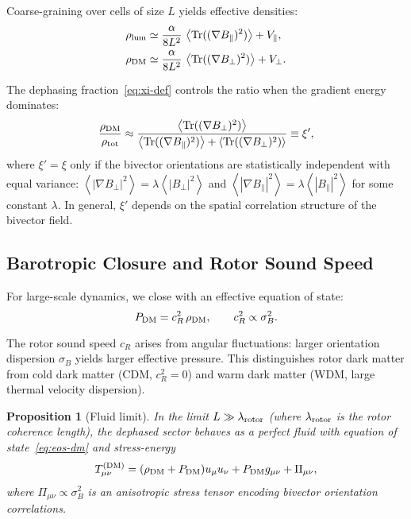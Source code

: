 \documentclass[11pt,a4paper]{article}
\numberwithin{equation}{section}
\theoremstyle{plain}
\newtheorem{proposition}[theorem]{Proposition}
\theoremstyle{definition}
\theoremstyle{remark}
\DeclareMathOperator{\Tr}{Tr}
\newcommand{\avg}[1]{\left\langle #1 \right\rangle}
\begin{document}
Coarse-graining over cells of size $L$ yields effective densities:
\begin{align}
\rho_{\rm lum} &\simeq \frac{\alpha}{8L^2}\,\avg{\Tr((\nabla B_\parallel)^2)} + V_\parallel,
\label{eq:rho-lum}\\
\rho_{\rm DM} &\simeq \frac{\alpha}{8L^2}\,\avg{\Tr((\nabla B_\perp)^2)} + V_\perp.
\label{eq:rho-dm}
\end{align}

The dephasing fraction~\eqref{eq:xi-def} controls the ratio when the gradient energy dominates:
\begin{equation}
\frac{\rho_{\rm DM}}{\rho_{\rm tot}} \approx \frac{\avg{\Tr((\nabla B_\perp)^2)}}{\avg{\Tr((\nabla B_\parallel)^2)} + \avg{\Tr((\nabla B_\perp)^2)}} \equiv \xi',
\end{equation}
where $\xi' = \xi$ only if the bivector orientations are statistically independent with equal variance: $\avg{|\nabla B_\perp|^2} = \lambda \avg{|B_\perp|^2}$ and $\avg{|\nabla B_\parallel|^2} = \lambda \avg{|B_\parallel|^2}$ for some constant $\lambda$. In general, $\xi'$ depends on the spatial correlation structure of the bivector field.

\subsection{Barotropic Closure and Rotor Sound Speed}

For large-scale dynamics, we close with an effective equation of state:
\begin{equation}
P_{\rm DM}=c_R^2\,\rho_{\rm DM},\qquad c_R^2\propto \sigma_B^2.
\label{eq:eos-dm}
\end{equation}

The rotor sound speed $c_R$ arises from angular fluctuations: larger orientation dispersion $\sigma_B$ yields larger effective pressure. This distinguishes rotor dark matter from cold dark matter (CDM, $c_R^2=0$) and warm dark matter (WDM, large thermal velocity dispersion).

\begin{proposition}[Fluid limit]
In the limit $L\gg \lambda_{\rm rotor}$ (where $\lambda_{\rm rotor}$ is the rotor coherence length), the dephased sector behaves as a perfect fluid with equation of state~\eqref{eq:eos-dm} and stress-energy
\begin{equation}
T^{(\rm DM)}_{\mu\nu}=(\rho_{\rm DM}+P_{\rm DM})u_\mu u_\nu + P_{\rm DM} g_{\mu\nu} + \Pi_{\mu\nu},
\label{eq:T-fluid}
\end{equation}
where $\Pi_{\mu\nu}\propto \sigma_B^2$ is an anisotropic stress tensor encoding bivector orientation correlations.
\end{proposition}
\end{document}
